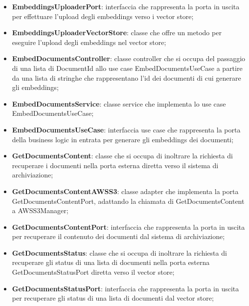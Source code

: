 \documentclass[10pt, a4paper]{article}
\begin{document}
\begin{itemize}
    \item \label{EmbeddingsUploaderPort}\textbf{EmbeddingsUploaderPort}: interfaccia che rappresenta la porta in uscita per effettuare l'upload degli embeddings verso i vector store;
    \item \label{EmbeddingsUploaderVectorStore}\textbf{EmbeddingsUploaderVectorStore}: classe che offre un metodo per eseguire l'upload degli embeddings nel vector store;
    \item \label{EmbedDocumentsController}\textbf{EmbedDocumentsController}: classe controller che si occupa del passaggio di una lista di DocumentId allo use case EmbedDocumentsUseCase a partire da una lista di stringhe che rappresentano l'id dei documenti di cui generare gli embeddings;
    \item \label{EmbedDocumentsService}\textbf{EmbedDocumentsService}: classe service che implementa lo use case EmbedDocumentsUseCase;
    \item \label{EmbedDocumentsUseCase}\textbf{EmbedDocumentsUseCase}: interfaccia use case che rappresenta la porta della business logic in entrata per generare gli embeddings dei documenti;    
    \item \label{GetDocumentsContent}\textbf{GetDocumentsContent}: classe che si occupa di inoltrare la richiesta di recuperare i documenti nella porta esterna diretta verso il sistema di archiviazione;
    
    \item \label{GetDocumentsContentAWSS3}\textbf{GetDocumentsContentAWSS3}: classe adapter che implementa la porta GetDocumentsContentPort, adattando la chiamata di GetDocumentsContent a AWSS3Manager;
    \item \label{GetDocumentsContentPort}\textbf{GetDocumentsContentPort}: interfaccia che rappresenta la porta in uscita per recuperare il contenuto dei documenti dal sistema di archiviazione;
    \item \label{GetDocumentsStatus}\textbf{GetDocumentsStatus}: classe che si occupa di inoltrare la richiesta di recuperare gli status di una lista di documenti nella porta esterna GetDocumentsStatusPort diretta verso il vector store;
    \item  \label{GetDocumentsStatusPort}\textbf{GetDocumentsStatusPort}: interfaccia che rappresenta la porta in uscita per recuperare gli status di una lista di documenti dal vector store;
    

\end{itemize}
\end{document}
